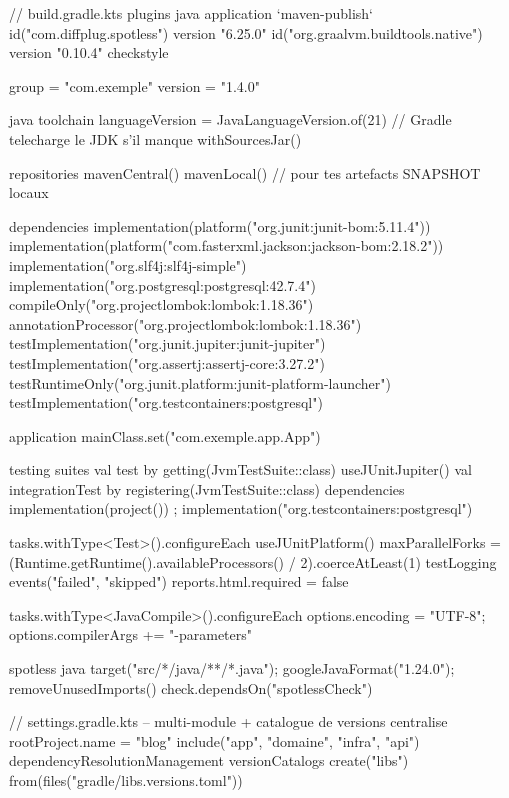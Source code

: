 \begin{codeconf}
// build.gradle.kts
plugins {
    java
    application
    `maven-publish`
    id("com.diffplug.spotless") version "6.25.0"
    id("org.graalvm.buildtools.native") version "0.10.4"
    checkstyle
}

group = "com.exemple"
version = "1.4.0"

java {
    toolchain { languageVersion = JavaLanguageVersion.of(21) }   // Gradle telecharge le JDK s'il manque
    withSourcesJar()
}

repositories {
    mavenCentral()
    mavenLocal()                       // pour tes artefacts SNAPSHOT locaux
}

dependencies {
    implementation(platform("org.junit:junit-bom:5.11.4"))
    implementation(platform("com.fasterxml.jackson:jackson-bom:2.18.2"))
    implementation("org.slf4j:slf4j-simple")
    implementation("org.postgresql:postgresql:42.7.4")
    compileOnly("org.projectlombok:lombok:1.18.36")
    annotationProcessor("org.projectlombok:lombok:1.18.36")
    testImplementation("org.junit.jupiter:junit-jupiter")
    testImplementation("org.assertj:assertj-core:3.27.2")
    testRuntimeOnly("org.junit.platform:junit-platform-launcher")
    testImplementation("org.testcontainers:postgresql")
}

application { mainClass.set("com.exemple.app.App") }

testing {
    suites {
        val test by getting(JvmTestSuite::class) { useJUnitJupiter() }
        val integrationTest by registering(JvmTestSuite::class) {
            dependencies { implementation(project()) ; implementation("org.testcontainers:postgresql") }
        }
    }
}

tasks.withType<Test>().configureEach {
    useJUnitPlatform()
    maxParallelForks = (Runtime.getRuntime().availableProcessors() / 2).coerceAtLeast(1)
    testLogging { events("failed", "skipped") }
    reports.html.required = false
}

tasks.withType<JavaCompile>().configureEach { options.encoding = "UTF-8"; options.compilerArgs += "-parameters" }

spotless { java { target("src/*/java/**/*.java"); googleJavaFormat("1.24.0"); removeUnusedImports() } }
check.dependsOn("spotlessCheck")
\end{codeconf}

\begin{codeconf}
// settings.gradle.kts -- multi-module + catalogue de versions centralise
rootProject.name = "blog"
include("app", "domaine", "infra", "api")
dependencyResolutionManagement {
    versionCatalogs {
        create("libs") {
            from(files("gradle/libs.versions.toml"))
        }
    }
}
\end{codeconf}

